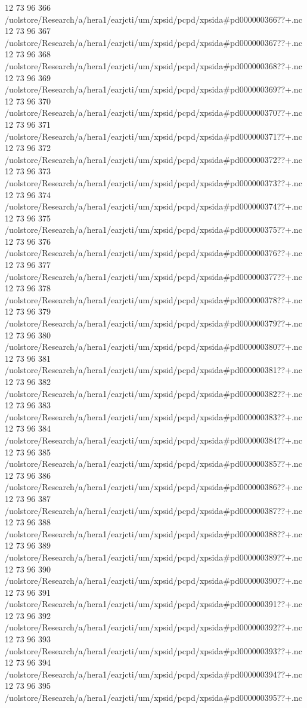 12 73 96
366
/uolstore/Research/a/hera1/earjcti/um/xpsid/pcpd/xpsida#pd000000366??+.nc
12 73 96
367
/uolstore/Research/a/hera1/earjcti/um/xpsid/pcpd/xpsida#pd000000367??+.nc
12 73 96
368
/uolstore/Research/a/hera1/earjcti/um/xpsid/pcpd/xpsida#pd000000368??+.nc
12 73 96
369
/uolstore/Research/a/hera1/earjcti/um/xpsid/pcpd/xpsida#pd000000369??+.nc
12 73 96
370
/uolstore/Research/a/hera1/earjcti/um/xpsid/pcpd/xpsida#pd000000370??+.nc
12 73 96
371
/uolstore/Research/a/hera1/earjcti/um/xpsid/pcpd/xpsida#pd000000371??+.nc
12 73 96
372
/uolstore/Research/a/hera1/earjcti/um/xpsid/pcpd/xpsida#pd000000372??+.nc
12 73 96
373
/uolstore/Research/a/hera1/earjcti/um/xpsid/pcpd/xpsida#pd000000373??+.nc
12 73 96
374
/uolstore/Research/a/hera1/earjcti/um/xpsid/pcpd/xpsida#pd000000374??+.nc
12 73 96
375
/uolstore/Research/a/hera1/earjcti/um/xpsid/pcpd/xpsida#pd000000375??+.nc
12 73 96
376
/uolstore/Research/a/hera1/earjcti/um/xpsid/pcpd/xpsida#pd000000376??+.nc
12 73 96
377
/uolstore/Research/a/hera1/earjcti/um/xpsid/pcpd/xpsida#pd000000377??+.nc
12 73 96
378
/uolstore/Research/a/hera1/earjcti/um/xpsid/pcpd/xpsida#pd000000378??+.nc
12 73 96
379
/uolstore/Research/a/hera1/earjcti/um/xpsid/pcpd/xpsida#pd000000379??+.nc
12 73 96
380
/uolstore/Research/a/hera1/earjcti/um/xpsid/pcpd/xpsida#pd000000380??+.nc
12 73 96
381
/uolstore/Research/a/hera1/earjcti/um/xpsid/pcpd/xpsida#pd000000381??+.nc
12 73 96
382
/uolstore/Research/a/hera1/earjcti/um/xpsid/pcpd/xpsida#pd000000382??+.nc
12 73 96
383
/uolstore/Research/a/hera1/earjcti/um/xpsid/pcpd/xpsida#pd000000383??+.nc
12 73 96
384
/uolstore/Research/a/hera1/earjcti/um/xpsid/pcpd/xpsida#pd000000384??+.nc
12 73 96
385
/uolstore/Research/a/hera1/earjcti/um/xpsid/pcpd/xpsida#pd000000385??+.nc
12 73 96
386
/uolstore/Research/a/hera1/earjcti/um/xpsid/pcpd/xpsida#pd000000386??+.nc
12 73 96
387
/uolstore/Research/a/hera1/earjcti/um/xpsid/pcpd/xpsida#pd000000387??+.nc
12 73 96
388
/uolstore/Research/a/hera1/earjcti/um/xpsid/pcpd/xpsida#pd000000388??+.nc
12 73 96
389
/uolstore/Research/a/hera1/earjcti/um/xpsid/pcpd/xpsida#pd000000389??+.nc
12 73 96
390
/uolstore/Research/a/hera1/earjcti/um/xpsid/pcpd/xpsida#pd000000390??+.nc
12 73 96
391
/uolstore/Research/a/hera1/earjcti/um/xpsid/pcpd/xpsida#pd000000391??+.nc
12 73 96
392
/uolstore/Research/a/hera1/earjcti/um/xpsid/pcpd/xpsida#pd000000392??+.nc
12 73 96
393
/uolstore/Research/a/hera1/earjcti/um/xpsid/pcpd/xpsida#pd000000393??+.nc
12 73 96
394
/uolstore/Research/a/hera1/earjcti/um/xpsid/pcpd/xpsida#pd000000394??+.nc
12 73 96
395
/uolstore/Research/a/hera1/earjcti/um/xpsid/pcpd/xpsida#pd000000395??+.nc
